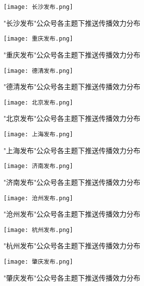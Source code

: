 
\begin{figure}[htbp]
  \centering
  \texttt{[image: 长沙发布.png]}
  \caption{"长沙发布"公众号各主题下推送传播效力分布}
  \label{fig:长沙发布-box}
\end{figure}

\begin{figure}[htbp]
  \centering
  \texttt{[image: 重庆发布.png]}
  \caption{"重庆发布"公众号各主题下推送传播效力分布}
  \label{fig:重庆发布-box}
\end{figure}

\begin{figure}[htbp]
  \centering
  \texttt{[image: 德清发布.png]}
  \caption{"德清发布"公众号各主题下推送传播效力分布}
  \label{fig:德清发布-box}
\end{figure}

\begin{figure}[htbp]
  \centering
  \texttt{[image: 北京发布.png]}
  \caption{"北京发布"公众号各主题下推送传播效力分布}
  \label{fig:北京发布-box}
\end{figure}

\begin{figure}[htbp]
  \centering
  \texttt{[image: 上海发布.png]}
  \caption{"上海发布"公众号各主题下推送传播效力分布}
  \label{fig:上海发布-box}
\end{figure}

\begin{figure}[htbp]
  \centering
  \texttt{[image: 济南发布.png]}
  \caption{"济南发布"公众号各主题下推送传播效力分布}
  \label{fig:济南发布-box}
\end{figure}

\begin{figure}[htbp]
  \centering
  \texttt{[image: 沧州发布.png]}
  \caption{"沧州发布"公众号各主题下推送传播效力分布}
  \label{fig:沧州发布-box}
\end{figure}

\begin{figure}[htbp]
  \centering
  \texttt{[image: 杭州发布.png]}
  \caption{"杭州发布"公众号各主题下推送传播效力分布}
  \label{fig:杭州发布-box}
\end{figure}

\begin{figure}[htbp]
  \centering
  \texttt{[image: 肇庆发布.png]}
  \caption{"肇庆发布"公众号各主题下推送传播效力分布}
  \label{fig:肇庆发布-box}
\end{figure}

